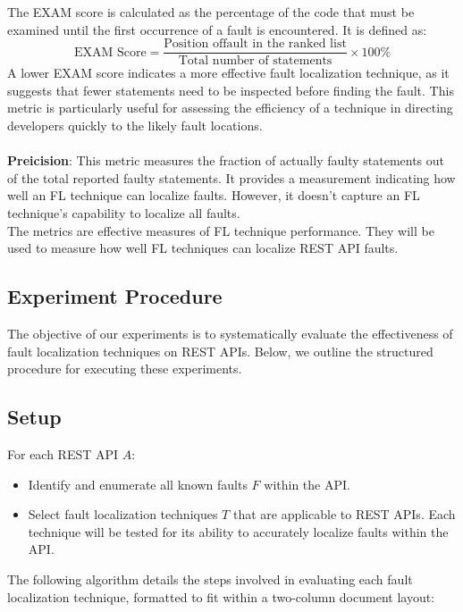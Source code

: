 \documentclass[conference]{IEEEtran}
\begin{document}
    The EXAM score is calculated as the percentage of the code that must be examined until the first occurrence of a fault is encountered. It is defined as:
    \\
    \[
    \text{EXAM Score} = \frac{\text{Position offault in the ranked list}}{\text{Total number of statements}} \times 100\%
    \]
    A lower EXAM score indicates a more effective fault localization technique, as it suggests that fewer statements need to be inspected before finding the fault. This metric is particularly useful for assessing the efficiency of a technique in directing developers quickly to the likely fault locations.
    \\ \\
    \textbf{Preicision}: This metric measures the fraction of actually faulty statements out of the total reported faulty statements. It provides a measurement indicating how well an FL technique can localize faults. However, it doesn't capture an FL technique's capability to localize all faults.
    \\

The metrics are effective measures of FL technique performance. They will be used to measure how well FL techniques can localize REST API faults.

\subsection{Experiment Procedure}
\label{sec:experiment-procedure}



The objective of our experiments is to systematically evaluate the effectiveness of fault localization techniques on REST APIs. Below, we outline the structured procedure for executing these experiments.

\subsection{Setup}
For each REST API \( A \):
\begin{itemize}
    \item Identify and enumerate all known faults \( F \) within the API.
    \item Select fault localization techniques \( T \) that are applicable to REST APIs. Each technique will be tested for its ability to accurately localize faults within the API.
\end{itemize}

The following algorithm details the steps involved in evaluating each fault localization technique, formatted to fit within a two-column document layout:
\end{document}
